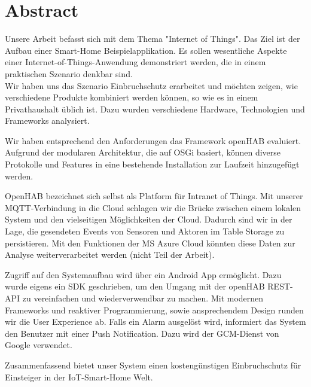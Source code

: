 
\chapter*{Abstract}

Unsere Arbeit befasst sich mit dem Thema "Internet of Things". Das Ziel ist der Aufbau einer Smart-Home Beispielapplikation. Es sollen wesentliche Aspekte einer Internet-of-Things-Anwendung demonstriert werden, die in einem praktischen Szenario denkbar sind. \\
Wir haben uns das Szenario Einbruchschutz erarbeitet und möchten zeigen, wie verschiedene Produkte kombiniert werden können, so wie es in einem Privathaushalt üblich ist. Dazu wurden verschiedene Hardware, Technologien und Frameworks analysiert.

Wir haben entsprechend den Anforderungen das Framework openHAB evaluiert. Aufgrund der modularen Architektur, die auf OSGi basiert, können diverse Protokolle und Features in eine bestehende Installation zur Laufzeit hinzugefügt werden.

OpenHAB bezeichnet sich selbst als Platform für Intranet of Things. Mit unserer MQTT-Verbindung in die Cloud schlagen wir die Brücke zwischen einem lokalen System und den vielseitigen Möglichkeiten der Cloud. Dadurch sind wir in der Lage, die gesendeten Events von Sensoren und Aktoren im Table Storage zu persistieren. Mit den Funktionen der MS Azure Cloud könnten diese Daten zur Analyse weiterverarbeitet werden (nicht Teil der Arbeit).

Zugriff auf den Systemaufbau wird über ein Android App ermöglicht. Dazu wurde eigens ein SDK geschrieben, um den Umgang mit der openHAB REST-API zu vereinfachen und wiederverwendbar zu machen. Mit modernen Frameworks und reaktiver Programmierung, sowie ansprechendem Design runden wir die User Experience ab. Falls ein Alarm ausgelöst wird, informiert das System den Benutzer mit einer Push Notification. Dazu wird der GCM-Dienst von Google verwendet.

Zusammenfassend bietet unser System einen kostengünstigen Einbruchschutz für Einsteiger in der IoT-Smart-Home Welt.